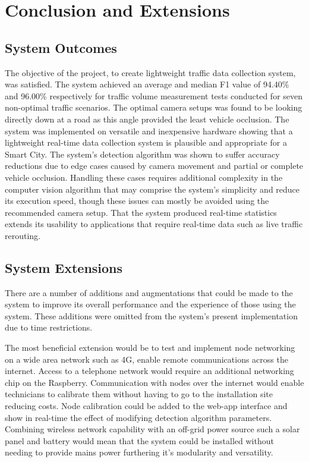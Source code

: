 \chapter{Conclusion and Extensions}

\section{System Outcomes}

The objective of the project, to create lightweight traffic data collection system, was satisfied. The system achieved an average and median F1 value of 94.40\% and 96.00\% respectively for traffic volume measurement tests conducted for seven non-optimal traffic scenarios. The optimal camera setups was found to be looking directly down at a road as this angle provided the least vehicle occlusion. The system was implemented on versatile and inexpensive hardware showing that a lightweight real-time data collection system is plausible and appropriate for a Smart City. The system's detection algorithm was shown to suffer accuracy reductions due to edge cases caused by camera movement and partial or complete vehicle occlusion. Handling these cases requires additional complexity in the computer vision algorithm that may comprise the system's simplicity and reduce its execution speed, though these issues can mostly be avoided using the recommended camera setup. That the system produced real-time statistics extends its usability to applications that require real-time data such as live traffic rerouting. 

\section{System Extensions}

There are a number of additions and augmentations that could be made to the system to improve its overall performance and the experience of those using the system. These additions were omitted from the system's present implementation due to time restrictions. 

The most beneficial extension would be to test and implement node networking on a wide area network such as 4G, enable remote communications across the internet. Access to a telephone network would require an additional networking chip on the Raspberry. Communication with nodes over the internet would enable technicians to calibrate them without having to go to the installation site reducing costs. Node calibration could be added to the web-app interface and show in real-time the effect of modifying detection algorithm parameters. Combining wireless network capability with an off-grid power source such a solar panel and battery would mean that the system could be installed without needing to provide mains power furthering it's modularity and versatility.


